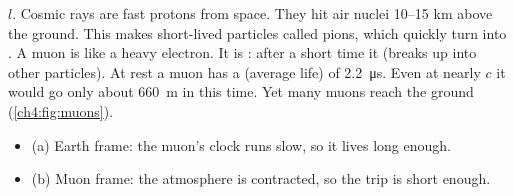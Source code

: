 \begin{sidebyside}[0.5]
{    $l$.}\label{ch4:fig:muons}
\nextside
  Cosmic rays are fast protons from space. They hit air nuclei 10--15 km above the ground. This
  makes short-lived particles called pions, which quickly turn into . A muon is
  like a heavy electron. It is : after a short time it  (breaks up
  into other particles). At rest a muon has a  (average life) of
  \qty{2.2}{\micro\second}. Even at nearly $c$ it would go only about \qty{660}{m} in this time.
  Yet many muons reach the ground (\cref{ch4:fig:muons}).
  \begin{itemize}
    \item (a) Earth frame: the muon's clock runs slow, so it lives long enough.
    \item (b) Muon frame: the atmosphere is contracted, so the trip is short enough.
  \end{itemize}
\end{sidebyside}

